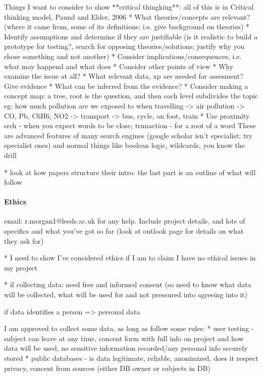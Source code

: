 \documentclass[a4paper]{report}
\begin{document}
        Things I want to consider to show **critical thingking**:
        all of this is in Critical thinking model, Paund and Elder, 2006
        * What theories/concepts are relevant?
          (where it came from, some of its definitions; i.e. give background on theories)
        * Identify assumptions and determine if they are justifiable
          (is it realistic to build a prototype for testing?, search for opposing
          theories/solutions; justify why you chose something and not another)
        * Consider implications/consequences, i.e. what may happend and what does
        * Consider other points of view
        * Why examine the issue at all?
        * What relevant data, xp are needed for assesment? Give evidence
        * What can be inferred from the evidence?
        * Consider making a concept map: a tree, root is the question, and then each level subdivides the topic
          eg: how much pollution are we exposed to when travelling -> air pollution -> CO, Pb, C6H6, NO2
                                                 -> transport    -> bus, cycle, on foot, train
        * Use proximity srch - when you expect words to be close; trunaction - for a root of a word
        These are advanced features of many search engines (google scholar isn't specialist; try specialist ones)
        and normal things like boolean logic, wildcards, you know the drill

        * look at how papers structure their intro: the last part is an outline of what will follow

        \paragraph{Ethics}
        email: r.morgan1@leeds.ac.uk for any help. Include project details, and
        lots of specifics and what you've got so far (look at outlook page for
        details on what they ask for)

        * I need to show I've considered ethics if I am to claim I have no
          ethical issues in my project

        * if collecting data: need free and informed consent (so need to know
          what data will be collected, what will be used for and not pressured
          into agreeing into it)

          if data identifies a person => personal data

          I am approved to collect some data, as long as follow some rules:
          * user testing - subject can leave at any time, concent form with full
            info on project and how data will be used, no sensitive information
            recorded/any personal info securely stored
          * public databases - is data legitimate, reliable, anonimized, does
            it respect privacy, concent from sources (either DB owner or subjects
            in DB)
\end{document}
